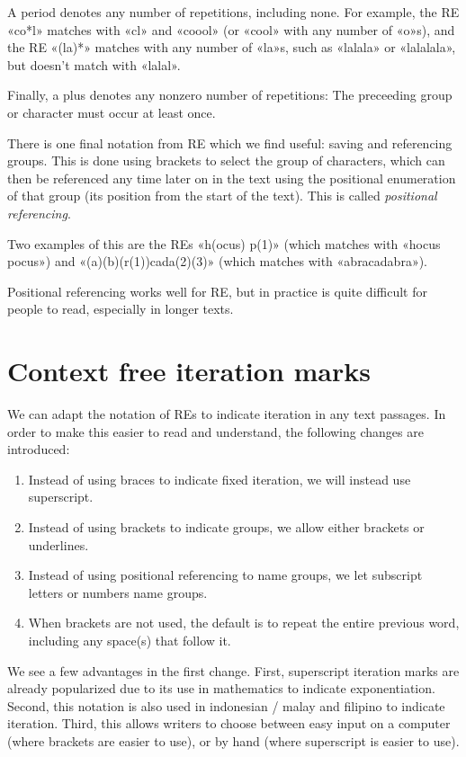 \documentclass{article}
\begin{document}
A period denotes any number of repetitions, including none. For example, the RE
«co*l» matches with «cl» and «coool» (or «cool» with any number of «o»s), and
the RE «(la)*» matches with any number of «la»s, such as «lalala» or
«lalalala», but doesn't match with «lalal».

Finally, a plus denotes any nonzero number of repetitions: The preceeding group
or character must occur at least once.

There is one final notation from RE which we find useful: saving and referencing
groups. This is done using brackets to select the group of characters, which can
then be referenced any time later on in the text using the positional
enumeration of that group (its position from the start of the text). This is
called \textit{positional referencing}.

Two examples of this are the REs «h(ocus) p(1)» (which matches with «hocus
pocus») and «(a)(b)(r(1))cada(2)(3)» (which matches with «abracadabra»).

Positional referencing works well for RE, but in practice is quite difficult for
people to read, especially in longer texts.

\section{Context free iteration marks}

We can adapt the notation of REs to indicate iteration in any text passages.
In order to make this easier to read and understand, the following changes are
introduced:

\begin{enumerate}
  \item Instead of using braces to indicate fixed iteration, we will instead
    use superscript.
  \item Instead of using brackets to indicate groups, we allow either brackets
    or underlines.
  \item Instead of using positional referencing to name groups, we let subscript
    letters or numbers name groups.
  \item When brackets are not used, the default is to repeat the entire previous
    word, including any space(s) that follow it.
\end{enumerate}

We see a few advantages in the first change. First, superscript iteration marks
are already popularized due to its use in mathematics to indicate
exponentiation. Second, this notation is also used in indonesian / malay and
filipino to indicate iteration. Third, this allows writers to choose between
easy input on a computer (where brackets are easier to use), or by hand
(where superscript is easier to use).
\end{document}
